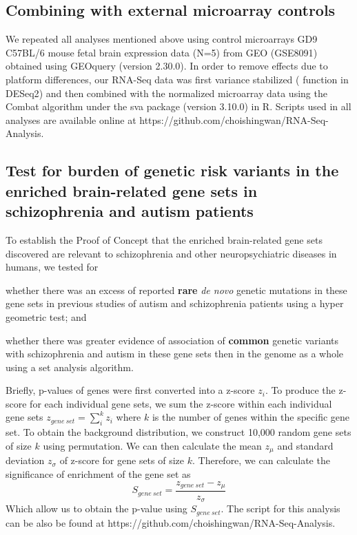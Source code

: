 \subsection{Combining with external microarray controls}
We repeated all analyses mentioned above using control microarrays GD9 C57BL/6 mouse fetal brain expression data (N=5) from GEO (GSE8091\cite{Hartl2008}) obtained using GEOquery (version 2.30.0)\cite{Davis2007}.
In order to remove effects due to platform differences, our RNA-Seq data was first variance stabilized ( function in DESeq2\cite{Anders2010}) and then combined with the normalized microarray data using the Combat algorithm\cite{Johnson2007} under the sva package (version 3.10.0) in R.
Scripts used in all analyses are available online at https://github.com/choishingwan/RNA-Seq-Analysis. 

\subsection{Test for burden of genetic risk variants in the enriched brain-related gene sets in schizophrenia and autism patients }
To establish the Proof of Concept that the enriched brain-related gene sets discovered are relevant to schizophrenia and other neuropsychiatric diseases in humans, we tested for 
\begin{enumerate*}[label=\roman*)]
	\item whether there was an excess of reported \textbf{rare} \textit{de novo} genetic mutations in these gene sets in previous studies of autism and schizophrenia patients\cite{Fromer2014,ORoak2012,Sanders2012,Neale2012} using a hyper geometric test; and
	\item whether there was greater evidence of association of \textbf{common} genetic variants with schizophrenia\cite{Ripke2013} and autism\cite{Anney2010a} in these gene sets then in the genome as a whole using a set analysis algorithm\cite{Ideker2002}. 
\end{enumerate*}
Briefly, p-values of genes were first converted into a z-score $z_i$. 
To produce the z-score for each individual gene sets, we sum the z-score within each individual gene sets $z_{gene\ set} = \sum_i^kz_i$ where $k$ is the number of genes within the specific gene set. 
To obtain the background distribution, we construct 10,000 random gene sets of size $k$ using permutation. 
We can then calculate the mean $z_\mu$ and standard deviation $z_\sigma$ of z-score for gene sets of size $k$.
Therefore, we can calculate the significance of enrichment of the gene set as
$$
S_{gene\ set}=\frac{z_{gene\ set}-z_\mu}{z_\sigma}
$$
Which allow us to obtain the p-value using $S_{gene\ set}$. 
The script for this analysis can be also be found at https://github.com/choishingwan/RNA-Seq-Analysis. 


